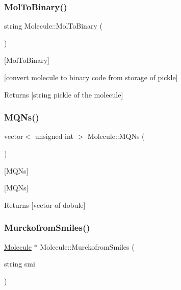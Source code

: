 \subsubsection{\texorpdfstring{Mol\+To\+Binary()}{MolToBinary()}}
{\footnotesize\ttfamily string Molecule\+::\+Mol\+To\+Binary (\begin{DoxyParamCaption}{ }\end{DoxyParamCaption})}



\mbox{[}Mol\+To\+Binary\mbox{]} 

\mbox{[}convert molecule to binary code from storage of pickle\mbox{]} \begin{DoxyReturn}{Returns}
\mbox{[}string pickle of the molecule\mbox{]} 
\end{DoxyReturn}
\mbox{\label{class_molecule_a982b663705ea294980bdb56458dc9bd1}} 
\subsubsection{\texorpdfstring{M\+Q\+Ns()}{MQNs()}}
{\footnotesize\ttfamily vector$<$ unsigned int $>$ Molecule\+::\+M\+Q\+Ns (\begin{DoxyParamCaption}{ }\end{DoxyParamCaption})}



\mbox{[}M\+Q\+Ns\mbox{]} 

\mbox{[}M\+Q\+Ns\mbox{]}

\begin{DoxyReturn}{Returns}
\mbox{[}vector of dobule\mbox{]} 
\end{DoxyReturn}
\mbox{\label{class_molecule_aa5264564f658fcca3635b11f6735c874}} 
\subsubsection{\texorpdfstring{Murckofrom\+Smiles()}{MurckofromSmiles()}}
{\footnotesize\ttfamily \mbox{\hyperlink{class_molecule}{Molecule}} $\ast$ Molecule\+::\+Murckofrom\+Smiles (\begin{DoxyParamCaption}\item[{string}]{smi }\end{DoxyParamCaption})\hspace{0.3cm}{\ttfamily [static]}}



